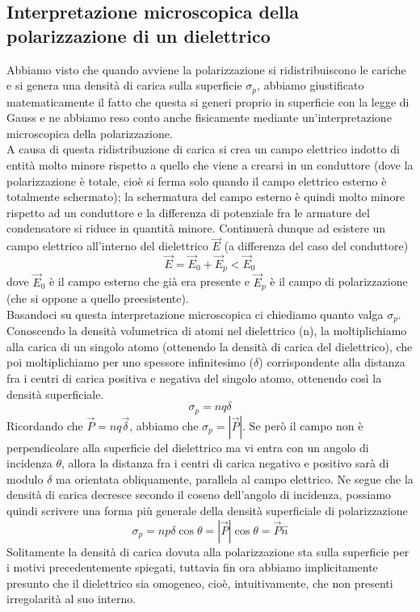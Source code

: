 \documentclass[10pt,a4paper]{article}
\begin{document}
\subsection{Interpretazione microscopica della polarizzazione di un dielettrico}
Abbiamo visto che quando avviene la polarizzazione si ridistribuiscono le cariche e si genera una densità di carica sulla superficie \(\sigma_p\), abbiamo giustificato matematicamente il fatto che questa si generi proprio in superficie con la legge di Gauss e ne abbiamo reso conto anche fisicamente mediante un'interpretazione microscopica della polarizzazione.\\
A causa di questa ridistribuzione di carica si crea un campo elettrico indotto di entità molto minore rispetto a quello che viene a crearsi in un conduttore (dove la polarizzazione è totale, cioè si ferma solo quando il campo elettrico esterno è totalmente schermato); la schermatura del campo esterno è quindi molto minore rispetto ad un conduttore e la differenza di potenziale fra le armature del condensatore si riduce in quantità minore. Continuerà dunque ad esistere un campo elettrico all'interno del dielettrico $\vec{E}$ (a differenza del caso del conduttore)
\[\vec{E} = \vec{E}_0+\vec{E}_p<\vec{E}_0\]
dove $\vec{E}_0$ è il campo esterno che già era presente e $\vec{E}_p$ è il campo di polarizzazione (che si oppone a quello preesistente).\\
Basandoci su questa interpretazione microscopica ci chiediamo quanto valga $\sigma_p$. Conoscendo la densità volumetrica di atomi nel dielettrico (n), la moltiplichiamo alla carica di un singolo atomo (ottenendo la densità di carica del dielettrico), che poi moltiplichiamo per uno spessore infinitesimo (\(\delta\)) corrispondente alla distanza fra i centri di carica positiva e negativa del singolo atomo, ottenendo così la densità superficiale.
\[\sigma_p = n q \delta\]
Ricordando che \(\vec{P} = nq\vec{\delta}\), abbiamo che $\sigma_p = |\vec{P}|$. Se però il campo non è perpendicolare alla superficie del dielettrico ma vi entra con un angolo di incidenza $\theta$, allora la distanza fra i centri di carica negativo e positivo sarà di modulo $\delta$ ma orientata obliquamente, parallela al campo elettrico. Ne segue che la densità di carica decresce secondo il coseno dell'angolo di incidenza, possiamo quindi scrivere una forma più generale della densità superficiale di polarizzazione
\[\sigma_p = np\delta \cos\theta= |\vec{P}|\cos\theta = \vec{P}\hat{n}\]
Solitamente la densità di carica dovuta alla polarizzazione sta sulla superficie per i motivi precedentemente spiegati, tuttavia fin ora abbiamo implicitamente presunto che il dielettrico sia omogeneo, cioè, intuitivamente, che non presenti irregolarità al suo interno.
\end{document}
